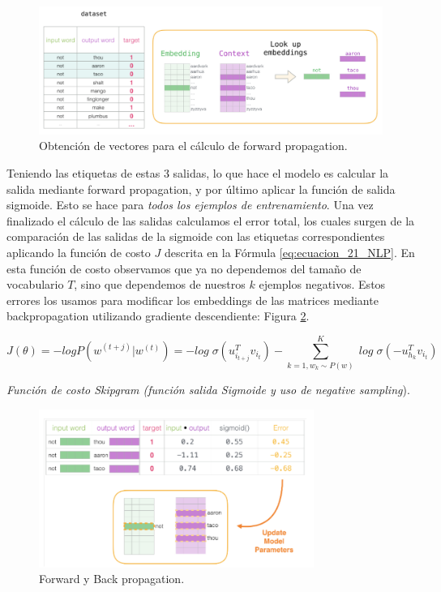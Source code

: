 \documentclass[12pt,a4paper]{article}
\begin{document}
\begin{sloppypar}
\begin{figure}[H]    
 \centering
 \includegraphics[width=1\textwidth]{images/NLP/28.png}
 \captionsetup{justification=centering,margin=3cm}
 \caption{Obtención de vectores para el cálculo de forward propagation\cite{datitos_nlp}.}
 \label{fig:Imagen_NLP_28}
\end{figure}

Teniendo las etiquetas de estas 3 salidas, lo que hace el modelo es calcular la salida mediante forward propagation, y por último aplicar la función de salida sigmoide. Esto se hace para \textit{todos los ejemplos de entrenamiento}. Una vez finalizado el cálculo de las salidas calculamos el error total, los cuales surgen de la comparación de las salidas de la sigmoide con las etiquetas correspondientes aplicando la función de costo $J$ descrita en la Fórmula \ref{eq:ecuacion_21_NLP}. En esta función de costo observamos que ya no dependemos del tamaño de vocabulario $T$, sino que dependemos de nuestros $k$ ejemplos negativos. Estos errores los usamos para modificar los embeddings de las matrices mediante backpropagation utilizando gradiente descendiente: Figura \ref{fig:Imagen_NLP_29}. 

\begin{equation}\label{eq:ecuacion_21_NLP}
J(\theta) = -log P(w^{(t+j)} | w^{(t)}) = - log \; \sigma (u_{i_{t+j}}^{T} v_{i_{t}}) - \sum_{k=1, w_k \sim P(w)}^{K} \;  log \; \sigma (-u_{h_{k}}^{T} v_{i_{t}})
\end{equation}
\begin{center}
\textit{Función de costo Skipgram (función salida Sigmoide y uso de negative sampling})\cite{NLP_27}.
\end{center}

\begin{figure}[H]    
 \centering
 \includegraphics[width=0.8\textwidth]{images/NLP/29.png}
 \caption{Forward y Back propagation\cite{datitos_nlp}.}
 \label{fig:Imagen_NLP_29}
\end{figure}


\end{sloppypar}
\end{document}

